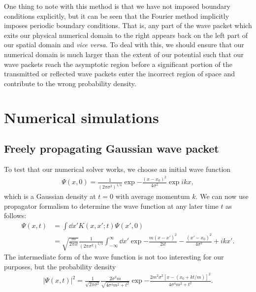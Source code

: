 One thing to note with this method is that we have not imposed boundary conditions explicitly, but it can be seen that the Fourier method implicitly imposes periodic boundary conditions.
That is, any part of the wave packet which exits our physical numerical domain to the right appears back on the left part of our spatial domain and \textit{vice versa}.
To deal with this, we should ensure that our numerical domain is much larger than the extent of our potential such that our wave packets reach the asymptotic region before a significant portion of the transmitted or reflected wave packets enter the incorrect region of space and contribute to the wrong probability density.


\section{Numerical simulations}
\label{sec:numerical-simulations}

\subsection{Freely propagating Gaussian wave packet}
\label{ssec:freely-propagating-gaussian-wave-packet}

To test that our numerical solver works, we choose an initial wave function
\begin{align}
    \Psi(x,0) = \frac{1}{(2 \pi \sigma^2)^{1/4}} \exp{-\frac{(x - x_{0})^2}{4 \sigma^2}} \exp{i k x}
,\end{align}
which is a Gaussian density at $t = 0$ with average momentum $k$.
We can now use propagator formalism to determine the wave function at any later time $t$ as follows:
\begin{align}
\label{eq:gauss-wave-prop}
    \Psi(x,t) &= \int \dd{x'} K(x,x';t) \Psi(x',0) \nonumber \\
              &= \sqrt{\frac{m}{2 \pi i t}} \frac{1}{(2 \pi \sigma^2)^{1/4}} \int_{-\infty}^{\infty} \dd{x'} \exp{-\frac{m(x - x')^2}{2 i t} - \frac{(x' - x_0)^2}{4 \sigma^2} + i k x'}
.\end{align}
The intermediate form of the wave function is not too interesting for our purposes, but the probability density
\begin{align}
    |\Psi(x,t)|^2 = \frac{1}{\sqrt{2 \pi \sigma^2}} \frac{2 \sigma^2 m}{\sqrt{ 4 \sigma^4 m^2 + t^2 }} \exp{ -\frac{2 m^2 \sigma^2 [ x - (x_0 + k t / m) ]^2}{4 \sigma^{4} m^2 + t^2} }
.\end{align}


